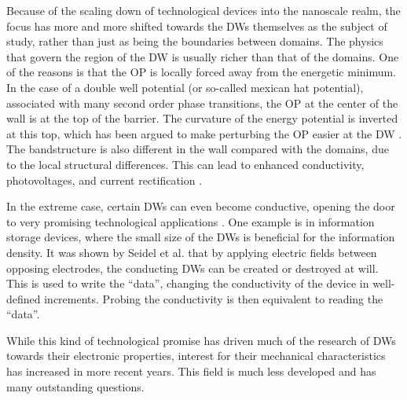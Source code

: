 Because of the scaling down of technological devices into the nanoscale realm, the focus has more and more shifted towards the DWs themselves as the subject of study, rather than just as being the boundaries between domains.
The physics that govern the region of the DW is usually richer than that of the domains. One of the reasons is that the OP is locally forced away from the energetic minimum.
In the case of a double well potential (or so-called mexican hat potential), associated with many second order phase transitions, the OP at the center of the wall is at the top of the barrier.
The curvature of the energy potential is inverted at this top, which has been argued to make perturbing the OP easier at the DW \cite{Scott2012}.
The bandstructure is also different in the wall compared with the domains, due to the local structural differences.
This can lead to enhanced conductivity, photovoltages, and current rectification \cite{Korbel2020,Huyan2019}.

In the extreme case, certain DWs can even become conductive, opening the door to very promising technological applications \cite{Seidel2009}.
One example is in information storage devices, where the small size of the DWs is beneficial for the information density.
It was shown by Seidel et al. that by applying electric fields between opposing electrodes, the conducting DWs can be created or destroyed at will. This is used to write the ``data'', changing  the conductivity of the device in well-defined increments.
Probing the conductivity is then equivalent to reading the ``data''. 

While this kind of technological promise has driven much of the research of DWs towards their electronic properties, interest for their mechanical characteristics has increased in more recent years.
This field is much less developed and has many outstanding questions.


